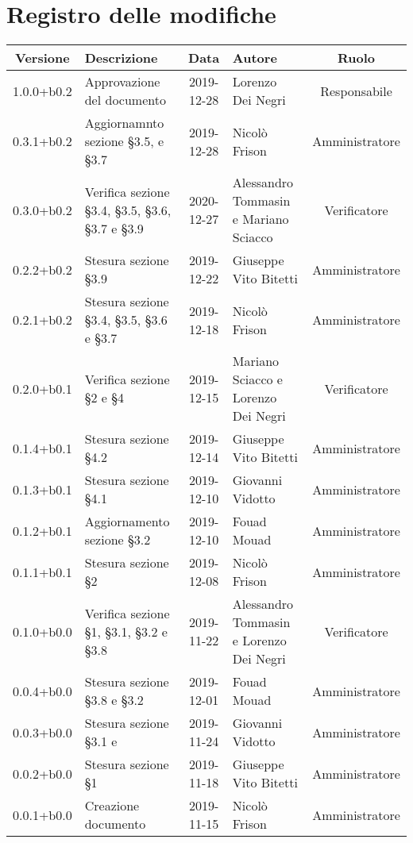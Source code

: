 \section*{Registro delle modifiche}

\begin{center}
	\begin{longtable}{|c|p{3cm}|c|p{4cm}|c|}
	\hline
	\rowcolor{lighter-grayer}
	\textbf{Versione} & \textbf{Descrizione} & \textbf{Data} & \textbf{Autore} & \textbf{Ruolo} \\
	\hline
	\endfirsthead



	\hline
	1.0.0+b0.2 & Approvazione del documento & 2019-12-28 & Lorenzo Dei Negri & Responsabile \\
	\hline
	0.3.1+b0.2 & Aggiornamnto sezione  \S3.5, e \S3.7 & 2019-12-28 & Nicolò Frison & Amministratore \\
	\hline 
	0.3.0+b0.2 & Verifica sezione \S3.4, \S3.5, \S3.6, \S3.7 e \S3.9 & 2020-12-27 & Alessandro Tommasin e Mariano Sciacco & Verificatore\\
	\hline
	0.2.2+b0.2 & Stesura sezione \S3.9 & 2019-12-22 & Giuseppe Vito Bitetti & Amministratore \\
	\hline
	0.2.1+b0.2 & Stesura sezione \S3.4, \S3.5, \S3.6 e \S3.7 & 2019-12-18 & Nicolò Frison & Amministratore \\
	\hline
	0.2.0+b0.1 & Verifica sezione \S2 e \S4 & 2019-12-15 & Mariano Sciacco e Lorenzo Dei Negri & Verificatore \\
	\hline
	0.1.4+b0.1 & Stesura sezione \S4.2 & 2019-12-14 & Giuseppe Vito Bitetti & Amministratore \\
	\hline
	0.1.3+b0.1 & Stesura sezione \S4.1 & 2019-12-10 & Giovanni Vidotto & Amministratore \\
	\hline
	0.1.2+b0.1 & Aggiornamento sezione \S3.2 & 2019-12-10 & Fouad Mouad & Amministratore \\
	\hline
	0.1.1+b0.1 & Stesura sezione \S2  & 2019-12-08 & Nicolò Frison & Amministratore \\
	\hline
	0.1.0+b0.0 & Verifica sezione \S1, \S3.1, \S3.2 e \S3.8 & 2019-11-22 & Alessandro Tommasin e Lorenzo Dei Negri & Verificatore \\
	\hline
	0.0.4+b0.0 & Stesura sezione \S3.8 e \S3.2 & 2019-12-01 & Fouad Mouad & Amministratore \\
	\hline
	0.0.3+b0.0 & Stesura sezione \S3.1 e & 2019-11-24 & Giovanni Vidotto & Amministratore \\
	\hline
	0.0.2+b0.0 & Stesura sezione \S1 & 2019-11-18 & Giuseppe Vito Bitetti & Amministratore \\
	\hline
	0.0.1+b0.0 & Creazione documento & 2019-11-15 & Nicolò Frison & Amministratore  \\
	\hline

	\end{longtable}
\end{center}
